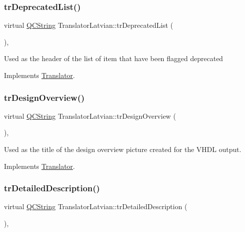 \subsubsection{\texorpdfstring{trDeprecatedList()}{trDeprecatedList()}}
{\footnotesize\ttfamily virtual \mbox{\hyperlink{class_q_c_string}{Q\+C\+String}} Translator\+Latvian\+::tr\+Deprecated\+List (\begin{DoxyParamCaption}{ }\end{DoxyParamCaption})\hspace{0.3cm}{\ttfamily [inline]}, {\ttfamily [virtual]}}

Used as the header of the list of item that have been flagged deprecated 

Implements \mbox{\hyperlink{class_translator}{Translator}}.

\mbox{\label{class_translator_latvian_a850ec1f142dc5d173b3c638079e44973}} 
\subsubsection{\texorpdfstring{trDesignOverview()}{trDesignOverview()}}
{\footnotesize\ttfamily virtual \mbox{\hyperlink{class_q_c_string}{Q\+C\+String}} Translator\+Latvian\+::tr\+Design\+Overview (\begin{DoxyParamCaption}{ }\end{DoxyParamCaption})\hspace{0.3cm}{\ttfamily [inline]}, {\ttfamily [virtual]}}

Used as the title of the design overview picture created for the V\+H\+DL output. 

Implements \mbox{\hyperlink{class_translator}{Translator}}.

\mbox{\label{class_translator_latvian_aaa3976198fafcb7cdc4e35ad34d02f0c}} 
\subsubsection{\texorpdfstring{trDetailedDescription()}{trDetailedDescription()}}
{\footnotesize\ttfamily virtual \mbox{\hyperlink{class_q_c_string}{Q\+C\+String}} Translator\+Latvian\+::tr\+Detailed\+Description (\begin{DoxyParamCaption}{ }\end{DoxyParamCaption})\hspace{0.3cm}{\ttfamily [inline]}, {\ttfamily [virtual]}}

